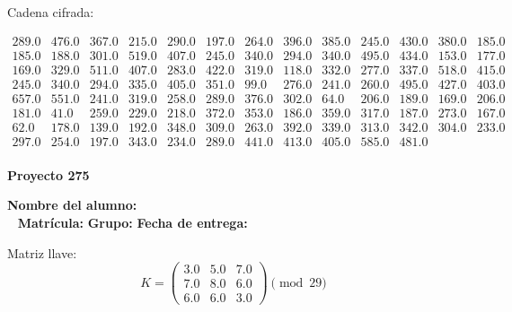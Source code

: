 \documentclass[12pt]{article}
\begin{document}
Cadena cifrada:
\begin{center}
$\begin{array}{lllllllllllll}
289.0 & 476.0 & 367.0 & 215.0 & 290.0 & 197.0 & 264.0 & 396.0 & 385.0 & 245.0 & 430.0 & 380.0 & 185.0\\
185.0 & 188.0 & 301.0 & 519.0 & 407.0 & 245.0 & 340.0 & 294.0 & 340.0 & 495.0 & 434.0 & 153.0 & 177.0\\
169.0 & 329.0 & 511.0 & 407.0 & 283.0 & 422.0 & 319.0 & 118.0 & 332.0 & 277.0 & 337.0 & 518.0 & 415.0\\
245.0 & 340.0 & 294.0 & 335.0 & 405.0 & 351.0 & 99.0 & 276.0 & 241.0 & 260.0 & 495.0 & 427.0 & 403.0\\
657.0 & 551.0 & 241.0 & 319.0 & 258.0 & 289.0 & 376.0 & 302.0 & 64.0 & 206.0 & 189.0 & 169.0 & 206.0\\
181.0 & 41.0 & 259.0 & 229.0 & 218.0 & 372.0 & 353.0 & 186.0 & 359.0 & 317.0 & 187.0 & 273.0 & 167.0\\
62.0 & 178.0 & 139.0 & 192.0 & 348.0 & 309.0 & 263.0 & 392.0 & 339.0 & 313.0 & 342.0 & 304.0 & 233.0\\
297.0 & 254.0 & 197.0 & 343.0 & 234.0 & 289.0 & 441.0 & 413.0 & 405.0 & 585.0 & 481.0\\
\end{array}$
\end{center}

\newpage


\textbf{Proyecto 275}

\textbf{Nombre del alumno:} \underline{\hspace{13cm}}\\\
\vspace{1cm}
\textbf{Matrícula:} \underline{\hspace{4cm}} \hspace{1cm}
\textbf{Grupo:} \underline{\hspace{2cm}}
\textbf{Fecha de entrega:} \underline{\hspace{2cm}}

\medskip

Matriz llave:
\[
K = \begin{pmatrix}
3.0 & 5.0 & 7.0\\
7.0 & 8.0 & 6.0\\
6.0 & 6.0 & 3.0
\end{pmatrix} \pmod{29}
\]
\end{document}
